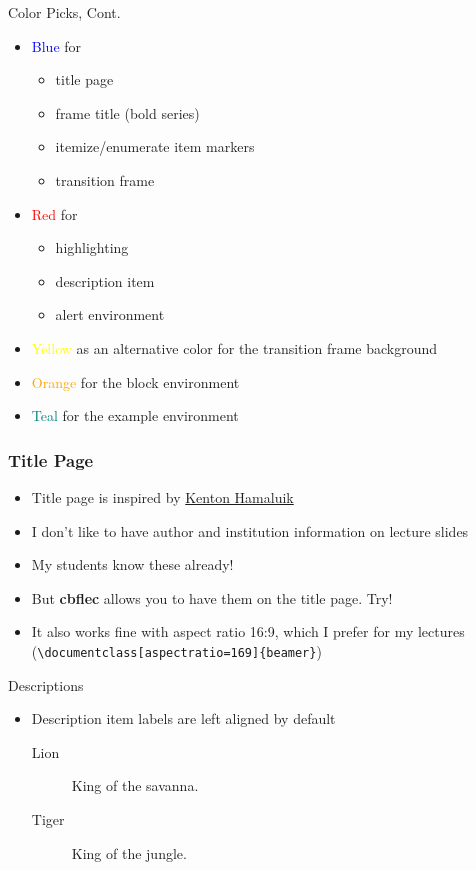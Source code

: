 \documentclass[11pt, aspectratio=43]{beamer}
\begin{document}
\begin{frame}{Color Picks, Cont.}
    \begin{itemize}
        \item \textcolor{blue}{Blue} for
        \begin{itemize}
            \item title page
            \item frame title (bold series)
            \item itemize/enumerate item markers
            \item transition frame
        \end{itemize}
        \item \textcolor{red}{Red} for
        \begin{itemize}
            \item highlighting 
            \item description item
            \item alert environment
        \end{itemize}
        \item \textcolor{yellow}{Yellow} as an alternative color for the transition frame background 
        \item \textcolor{orange}{Orange} for the block environment
        \item \textcolor{teal}{Teal} for the example environment
    \end{itemize}
\end{frame}

\begin{frame}[fragile]
    \frametitle{Title Page}
    \begin{itemize}
        \item Title page is inspired by \href{https://blog.hamaluik.ca/posts/better-beamer-themes/}{Kenton Hamaluik}
        \item I don't like to have author and institution information on lecture slides
        \item My students know these already!
        \item But \textbf{cbflec} allows you to have them on the title page. Try!
        \item It also works fine with aspect ratio 16:9, which I prefer for my lectures (\verb!\documentclass[aspectratio=169]{beamer}!)
    \end{itemize}
\end{frame}

\begin{frame}{Descriptions}
    \begin{itemize}
        \item Description item labels are left aligned by default
        \begin{description}
            \item[Lion] King of the savanna.
            \item[Tiger] King of the jungle.
        \end{description}
    \end{itemize}
\end{frame}
\end{document}
